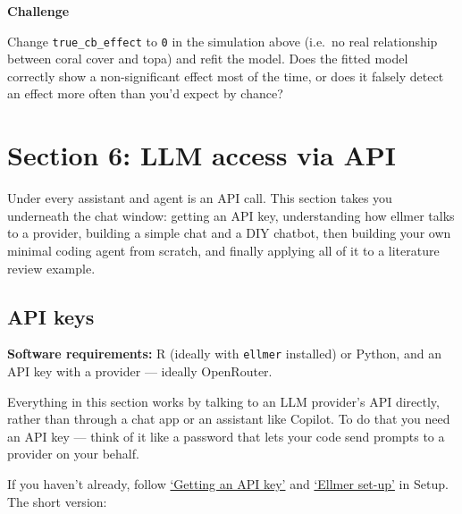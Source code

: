 \documentclass[
  letterpaper,
  DIV=11,
  numbers=noendperiod]{scrreprt}
\begin{document}
\begin{tcolorbox}[enhanced jigsaw, toprule=.15mm, rightrule=.15mm, left=2mm, leftrule=.75mm, breakable, opacityback=0, arc=.35mm, colframe=quarto-callout-important-color-frame, bottomrule=.15mm, colback=white]
\begin{minipage}[t]{5.5mm}
\textcolor{quarto-callout-important-color}{\faExclamation}
\end{minipage}%
\begin{minipage}[t]{\textwidth - 5.5mm}

\vspace{-3mm}\textbf{Challenge}\vspace{3mm}

Change \texttt{true\_cb\_effect} to \texttt{0} in the simulation above
(i.e.~no real relationship between coral cover and topa) and refit the
model. Does the fitted model correctly show a non-significant effect
most of the time, or does it falsely detect an effect more often than
you'd expect by chance?

\end{minipage}%
\end{tcolorbox}

\part{Section 6: LLM access via API}

Under every assistant and agent is an API call. This section takes you
underneath the chat window: getting an API key, understanding how ellmer
talks to a provider, building a simple chat and a DIY chatbot, then
building your own minimal coding agent from scratch, and finally
applying all of it to a literature review example.

\chapter{API keys}\label{api-keys}

\textbf{Software requirements:} R (ideally with \texttt{ellmer}
installed) or Python, and an API key with a provider --- ideally
OpenRouter.

Everything in this section works by talking to an LLM provider's API
directly, rather than through a chat app or an assistant like Copilot.
To do that you need an API key --- think of it like a password that lets
your code send prompts to a provider on your behalf.

If you haven't already, follow \hyperref[sec-apikeys]{`Getting an API
key'} and \hyperref[sec-ellmer]{`Ellmer set-up'} in Setup. The short
version:
\end{document}
